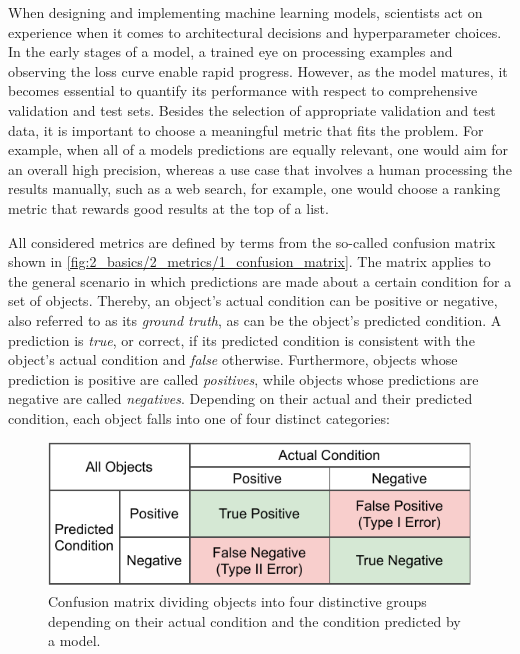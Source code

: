 When designing and implementing machine learning models, scientists act on experience when it comes to architectural decisions and hyperparameter choices. In the early stages of a model, a trained eye on processing examples and observing the loss curve enable rapid progress. However, as the model matures, it becomes essential to quantify its performance with respect to comprehensive validation and test sets. Besides the selection of appropriate validation and test data, it is important to choose a meaningful metric that fits the problem. For example, when all of a models predictions are equally relevant, one would aim for an overall high precision, whereas a use case that involves a human processing the results manually, such as a web search, for example, one would choose a ranking metric that rewards good results at the top of a list.

All considered metrics are defined by terms from the so-called confusion matrix shown in \autoref{fig:2_basics/2_metrics/1_confusion_matrix}. The matrix applies to the general scenario in which predictions are made about a certain condition for a set of objects. Thereby, an object's actual condition can be positive or negative, also referred to as its \emph{ground truth}, as can be the object's predicted condition. A prediction is \emph{true}, or correct, if its predicted condition is consistent with the object's actual condition and \emph{false} otherwise. Furthermore, objects whose prediction is positive are called \emph{positives}, while objects whose predictions are negative are called \emph{negatives}. Depending on their actual and their predicted condition, each object falls into one of four distinct categories:

\begin{figure}[t]
    \centering
    \includegraphics{2_basics/2_metrics/confusion_matrix}
    \caption{Confusion matrix dividing objects into four distinctive groups depending on their actual condition and the condition predicted by a model.}
    \label{fig:2_basics/2_metrics/1_confusion_matrix}
\end{figure}


